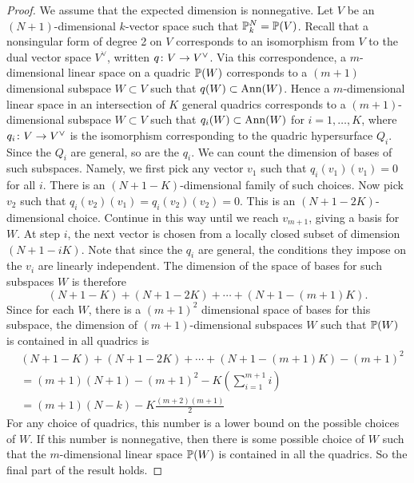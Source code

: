 \begin{proof}
We assume that the expected dimension is nonnegative. Let $V$ be an $(N+1)$-dimensional $k$-vector space such that $\P_k^N = \P(V)$. Recall that a nonsingular form of degree 2 on $V$ corresponds to an isomorphism from $V$ to the dual vector space $V^\vee$, written $q \from V \to V^\vee$. Via this correspondence, a $m$-dimensional linear space on a quadric $\P(W)$ corresponds to a $(m+1)$ dimensional subspace $W \subset V$ such that $q(W) \subset \Ann(W)$. Hence a $m$-dimensional linear space in an intersection of $K$ general quadrics corresponds to a $(m+1)$-dimensional subspace $W \subset V$ such that $q_i(W) \subset \Ann(W)$ for $i=1,\dots,K$, where $q_i\from V \to V^\vee$ is the isomorphism corresponding to the quadric hypersurface $Q_i$. Since the $Q_i$ are general, so are the $q_i$. We can count the dimension of bases of such subspaces. Namely, we first pick any vector $v_1$ such that $q_i(v_1)(v_1) = 0$ for all $i$. There is an $(N+1-K)$-dimensional family of such choices. Now pick $v_2$ such that $q_i(v_2)(v_1) = q_i(v_2)(v_2) = 0$. This is an $(N+1-2K)$-dimensional choice. Continue in this way until we reach $v_{m+1}$, giving a basis for $W$. At step $i$, the next vector is chosen from a locally closed subset of dimension $(N+1-iK)$. Note that since the $q_i$ are general, the conditions they impose on the $v_i$ are linearly independent. The dimension of the space of bases for such subspaces $W$ is therefore
\[(N+1-K)+(N+1-2K)+\cdots+(N+1-(m+1)K).\]
Since for each $W$, there is a $(m+1)^2$ dimensional space of bases for this subspace, the dimension of $(m+1)$-dimensional subspaces $W$ such that $\P(W)$ is contained in all quadrics is
\begin{align*}
  &(N+1-K)+(N+1-2K)+\cdots+(N+1-(m+1)K) - (m+1)^2\\
 &= (m+1)(N+1) - (m+1)^2 - K \left(\sum_{i=1}^{m+1}i \right)\\
&= (m+1)(N-k) - K \frac{(m+2)(m+1)}{2}
\end{align*}
For any choice of quadrics, this number is a lower bound on the possible choices of $W$. If this number is nonnegative, then there is some possible choice of $W$ such that the $m$-dimensional linear space $\P(W)$ is contained in all the quadrics. So the final part of the result holds.

\end{proof}
